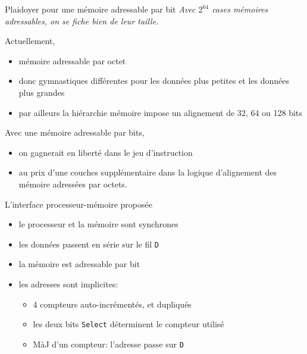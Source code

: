 \documentclass[slidetop,11pt,table]{beamer}
\begin{document}
\begin{frame}{Plaidoyer pour une mémoire adressable par bit}
  \emph{Avec $2^{64}$  cases mémoires adressables, on se fiche bien de leur taille.}

  \vfill
  Actuellement,
  \begin{itemize}
  \item mémoire adressable par octet
  \item donc gymnastiques différentes pour les données plus petites et les données plus grandes
  \item par ailleurs la hiérarchie mémoire impose un alignement de 32, 64 ou 128 bits 
  \end{itemize}

  Avec une mémoire adressable par bits,
  \begin{itemize}
  \item on gagnerait en liberté dans le jeu d'instruction
  \item au prix d'une couches supplémentaire dans la logique d'alignement des mémoire adressées par octets.
  \end{itemize}
\end{frame}


\begin{frame}{L'interface processeur-mémoire proposée}
  \begin{figure}[b]
    \begin{center}
      \scalebox{0.8}{\proco}
    \end{center}
  \end{figure}
  \begin{itemize}
  \item le processeur et la mémoire sont synchrones
  \item les données passent en série sur le fil \texttt{D}
  \item la mémoire est adressable par bit
  \item les adresses sont implicites:
    \begin{itemize}
    \item 4 compteurs auto-incrémentés, et dupliqués
    \item les deux bits \texttt{Select} déterminent le compteur utilisé
    \item MàJ d'un compteur: l'adresse passe sur  \texttt{D}
    \end{itemize}
  \end{itemize}
\end{frame}
\end{document}

